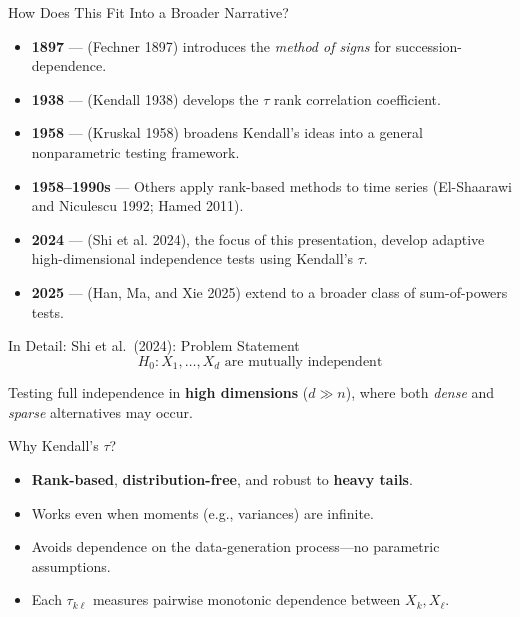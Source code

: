 \documentclass[
  ignorenonframetext,
]{beamer}
\providecommand{\tightlist}{%
  \setlength{\itemsep}{0pt}\setlength{\parskip}{0pt}}
\begin{document}
\begin{frame}{How Does This Fit Into a Broader Narrative?}
\label{how-does-this-fit-into-a-broader-narrative}
\begin{itemize}
\tightlist
\item
  \textbf{1897} --- (Fechner 1897) introduces the \emph{method of signs}
  for succession-dependence.
\item
  \textbf{1938} --- (Kendall 1938) develops the \(\tau\) rank
  correlation coefficient.
\item
  \textbf{1958} --- (Kruskal 1958) broadens Kendall's ideas into a
  general nonparametric testing framework.
\item
  \textbf{1958--1990s} --- Others apply rank-based methods to time
  series (El-Shaarawi and Niculescu 1992; Hamed 2011).
\item
  \textbf{2024} --- (Shi et al. 2024), the focus of this presentation,
  develop adaptive high-dimensional independence tests using Kendall's
  \(\tau\).
\item
  \textbf{2025} --- (Han, Ma, and Xie 2025) extend to a broader class of
  sum-of-powers tests.
\end{itemize}
\end{frame}

\begin{frame}{In Detail: Shi et al.~(2024): Problem Statement}
\label{in-detail-shi-et-al.-2024-problem-statement}
\[
H_0: X_1, \dots, X_d \text{ are mutually independent}
\]

Testing full independence in \textbf{high dimensions} (\(d \gg n\)),
where both \emph{dense} and \emph{sparse} alternatives may occur.
\end{frame}

\begin{frame}{Why Kendall's \(\tau\)?}
\label{why-kendalls-tau}
\begin{itemize}
\tightlist
\item
  \textbf{Rank-based}, \textbf{distribution-free}, and robust to
  \textbf{heavy tails}.\\
\item
  Works even when moments (e.g., variances) are infinite.\\
\item
  Avoids dependence on the data-generation process---no parametric
  assumptions.\\
\item
  Each \(\tau_{k\ell}\) measures pairwise monotonic dependence between
  \(X_k, X_\ell\).
\end{itemize}
\end{frame}
\end{document}
